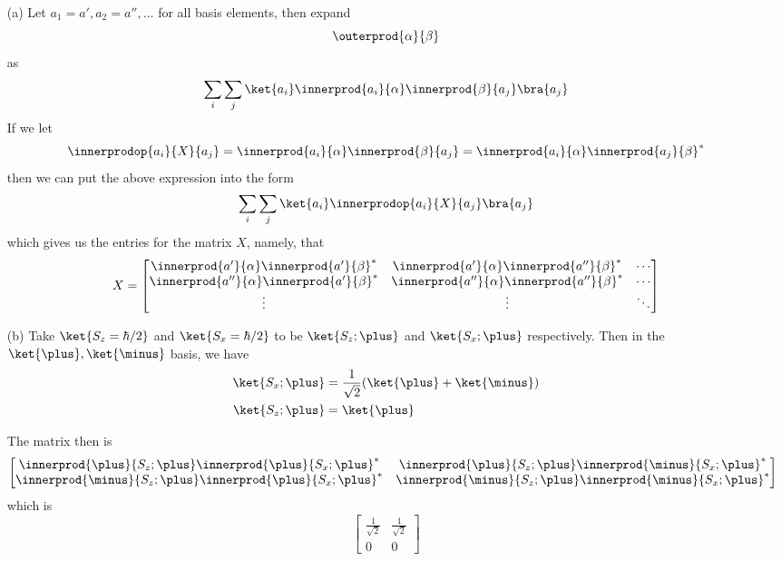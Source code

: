 \begin{itemize}
\item[(a)] Let $a_1 = a', a_2 = a'', \ldots$ for all basis elements,
  then expand
  \[ \outerprod{\alpha}{\beta} \]
  as
  \[ \sum_i\sum_j\ket{a_i}\innerprod{a_i}{\alpha}\innerprod{\beta}{a_j}\bra{a_j} \]
  If we let
  \[ \innerprodop{a_i}{X}{a_j} = \innerprod{a_i}{\alpha}\innerprod{\beta}{a_j} =\innerprod{a_i}{\alpha}\innerprod{a_j}{\beta}^* \]
  then we can put the above expression into the form
  \[ \sum_i\sum_j\ket{a_i}\innerprodop{a_i}{X}{a_j}\bra{a_j} \]
  which gives us the entries for the matrix $X$, namely, that
  \begin{equation*}
    X =
    \begin{bmatrix}
      \innerprod{a'}{\alpha}\innerprod{a'}{\beta}^* & \innerprod{a'}{\alpha}\innerprod{a''}{\beta}^* & \cdots \\
      \innerprod{a''}{\alpha}\innerprod{a'}{\beta}^* & \innerprod{a''}{\alpha}\innerprod{a''}{\beta}^* & \cdots \\
      \vdots  & \vdots  & \ddots
    \end{bmatrix}
  \end{equation*}


\item[(b)] Take $\ket{S_z = \hbar/2}$ and $\ket{S_x = \hbar/2}$ to be
  $\ket{S_z;\plus}$ and $\ket{S_x; \plus}$ respectively.  Then in the
  $\ket{\plus},\ket{\minus}$ basis, we have
  \begin{align*}
    \ket{S_x;\plus} &= \frac{1}{\sqrt{2}}(\ket{\plus} + \ket{\minus}) \\
    \ket{S_z;\plus} &= \ket{\plus}
  \end{align*}

  The matrix then is
  \[
  \begin{bmatrix}
    \innerprod{\plus}{S_z;\plus}\innerprod{\plus}{S_x;\plus}^* &
    \innerprod{\plus}{S_z;\plus}\innerprod{\minus}{S_x;\plus}^* \\

    \innerprod{\minus}{S_z;\plus}\innerprod{\plus}{S_x;\plus}^* &
    \innerprod{\minus}{S_z;\plus}\innerprod{\minus}{S_x;\plus}^*
  \end{bmatrix}
  \]
  which is
  \[
  \begin{bmatrix}
    \frac{1}{\sqrt{2}} & \frac{1}{\sqrt{2}} \\
    0 & 0
  \end{bmatrix}
  \]
\end{itemize}
